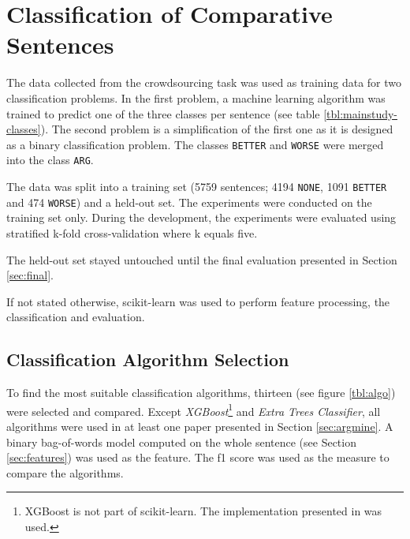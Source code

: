 \chapter{Classification of Comparative Sentences}
\label{chp:class}
The data collected from the crowdsourcing task was used as training data for two classification problems. In the first problem, a machine learning algorithm was trained to predict one of the three classes per sentence (see table \ref{tbl:mainstudy-classes}). The second problem is a simplification of the first one as it is designed as a binary classification problem. The classes \texttt{BETTER} and \texttt{WORSE} were merged into the class \texttt{ARG}.

The data was split into a training set (5759 sentences; 4194 \texttt{NONE}, 1091 \texttt{BETTER} and 474 \texttt{WORSE}) and a held-out set.
The experiments were conducted on the training set only. During the development, the experiments were evaluated using stratified k-fold cross-validation where k equals five. 

The held-out set stayed untouched until the final evaluation presented in Section \ref{sec:final}.

If not stated otherwise, scikit-learn \cite{scikit-learn} was used to perform feature processing, the classification and evaluation.

\section{Classification Algorithm Selection}


To find the most suitable classification algorithms, thirteen (see figure \ref{tbl:algo}) were selected and compared. Except \emph{XGBoost}\footnote{XGBoost is not part of scikit-learn. The implementation presented in \cite{DBLP:journals/corr/ChenG16} was used.} and \emph{Extra Trees Classifier}, all algorithms were used in at least one paper presented in Section \ref{sec:argmine}. A binary bag-of-words model computed on the whole sentence (see Section \ref{sec:features}) was used as the feature. The f1 score was used as the measure to compare the algorithms. 

